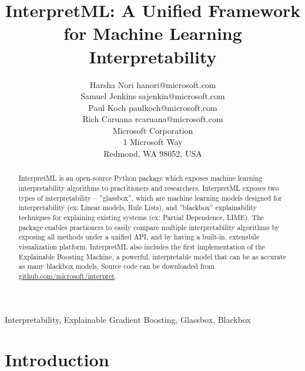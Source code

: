 \documentclass[twoside,11pt]{article}
\begin{document}
\title{InterpretML: A Unified Framework for Machine Learning Interpretability}

\author{\name Harsha Nori \email hanori@microsoft.com \\
        \name Samuel Jenkins \email sajenkin@microsoft.com \\
        \name Paul Koch \email paulkoch@microsoft.com \\
       \name Rich Caruana \email rcaruana@microsoft.com \\
       \addr Microsoft Corporation\\
       1 Microsoft Way\\
       Redmond, WA 98052, USA}


\maketitle

\begin{abstract}%

InterpretML is an open-source Python package which exposes machine learning interpretability algorithms to practitioners and researchers. InterpretML exposes two types of interpretability -- ''glassbox'', which are machine learning models designed for interpretability (ex: Linear models, Rule Lists), and ''blackbox'' explainability techniques for explaining existing systems (ex: Partial Dependence, LIME). The package enables practioners to easily compare multiple interpretability algorithms by exposing all methods under a unified API, and by having a built-in, extensbile visualization platform. InterpretML also includes the first implementation of the Explainable Boosting Machine, a powerful, interpretable model that can be as accurate as many blackbox models. Source code can be downloaded from \href{https://github.com/microsoft/interpret}{github.com/microsoft/interpret}. 

\end{abstract}

\begin{keywords}
Interpretability, Explainable Gradient Boosting, Glassbox, Blackbox
\end{keywords}

\section{Introduction}
\end{document}
